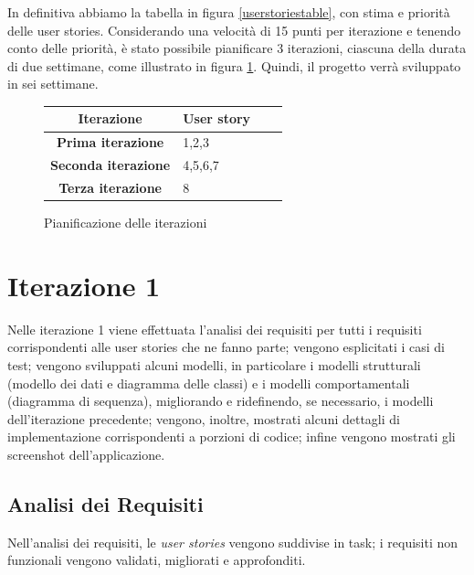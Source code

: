 In definitiva abbiamo la tabella in figura \ref{userstoriestable}, con stima e priorità delle user stories.
Considerando una velocità di 15 punti per iterazione e tenendo conto delle priorità, è stato possibile pianificare 3 iterazioni, ciascuna della durata di due settimane, come illustrato in figura \ref{pianificazioneiterazioni}.
Quindi, il progetto verrà sviluppato in sei settimane.
\begin{figure}[h!]
\begin{center}

\begin{tabular}[c]{|c|p{7cm}|c|c|}
\hline
Iterazione & User story\\ \hline
\textbf{Prima iterazione} & 1,2,3 \\ \hline
\textbf{Seconda iterazione} & 4,5,6,7\\ \hline
\textbf{Terza iterazione} & 8\\ \hline
\end{tabular}
\caption{Pianificazione delle iterazioni\label{pianificazioneiterazioni}}

\end{center}
\end{figure}

\clearpage




\section{Iterazione 1}
Nelle iterazione 1 viene effettuata l'analisi dei requisiti per tutti i requisiti corrispondenti alle user stories che ne fanno parte; vengono esplicitati i casi di test; vengono sviluppati alcuni modelli, in particolare i modelli strutturali (modello dei dati e diagramma delle classi) e i modelli comportamentali (diagramma di sequenza), migliorando e ridefinendo, se necessario, i modelli dell'iterazione precedente; vengono, inoltre, mostrati alcuni dettagli di implementazione corrispondenti a porzioni di codice; infine vengono mostrati gli screenshot dell'applicazione.\\

\subsection{Analisi dei Requisiti}
Nell'analisi dei requisiti, le \textit{user stories} vengono suddivise in task; i requisiti non funzionali vengono validati, migliorati e approfonditi.

